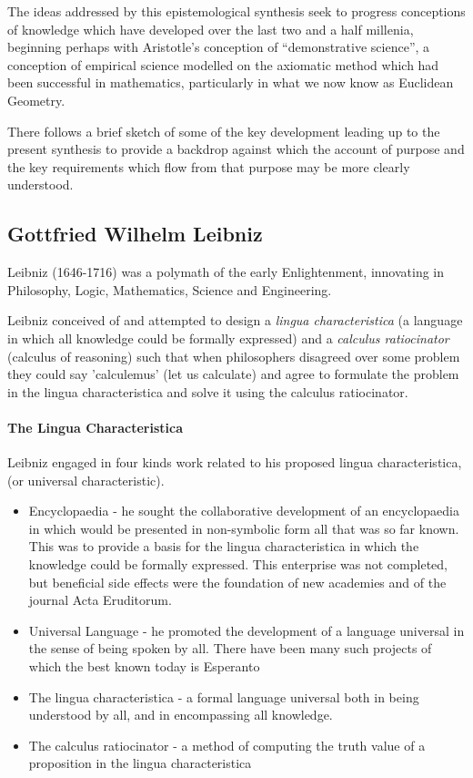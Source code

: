 \documentclass[10pt,titlepage]{book}
\begin{document}
The ideas addressed by this epistemological synthesis seek to progress conceptions of knowledge which have developed over the last two and a half millenia, beginning perhaps with Aristotle's conception of ``demonstrative science'', a conception of empirical science modelled on the axiomatic method which had been successful in mathematics, particularly in what we now know as Euclidean Geometry.

There follows a brief sketch of some of the key development leading up to the present synthesis to provide a backdrop against which the account of purpose and the key requirements which flow from that purpose may be more clearly understood.

\subsection{Gottfried Wilhelm Leibniz}

Leibniz (1646-1716) was a polymath of the early Enlightenment, innovating in Philosophy, Logic, Mathematics, Science and Engineering. 

Leibniz conceived of and attempted to design a \emph{lingua characteristica} (a language in which all knowledge could be formally expressed) and a \emph{calculus ratiocinator} (calculus of reasoning) such that when philosophers disagreed over some problem they could say 'calculemus' (let us calculate) and agree to formulate the problem in the lingua characteristica and solve it using the calculus ratiocinator.

\paragraph{The Lingua Characteristica}
Leibniz engaged in four kinds work related to his proposed lingua characteristica, (or universal characteristic).
\begin{itemize}
\item Encyclopaedia - he sought the collaborative development of an encyclopaedia in which would be presented in non-symbolic form all that was so far known. This was to provide a basis for the lingua characteristica in which the knowledge could be formally expressed. This enterprise was not completed, but beneficial side effects were the foundation of new academies and of the journal Acta Eruditorum.
\item Universal Language - he promoted the development of a language universal in the sense of being spoken by all. There have been many such projects of which the best known today is Esperanto
\item The lingua characteristica - a formal language universal both in being understood by all, and in encompassing all knowledge.
\item The calculus ratiocinator - a method of computing the truth value of a proposition in the lingua characteristica
\end{itemize}
\end{document}
